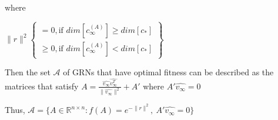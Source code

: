\documentclass[a4paper,12pt]{article}
\begin{document}
where 

$\lVert r \rVert^{2} \left\{\begin{array}{c} = 0, \text{if } dim{[c_{\infty}^{(A)}]} \geq dim{[c_{*}]} \\  \geq 0,  \text{if } dim{[c_{\infty}^{(A)}]} <  dim{[c_{*}]} \end{array} \right\}$

Then the set $\mathcal{A}$ of GRNs that have optimal fitness can be described as the matrices that satisfy $A = \frac{\hat{v_{\infty}} \hat{v_{\infty}^{T}}}{\lVert \hat{v_{\infty}} \rVert^{2}} + A'$ where $A' \hat{v_{\infty}} = 0$

Thus, $\mathcal{A} = \{A \in \mathbb{R}^{n \times n} : f(A) = e^{- \lVert r \rVert^{2}}, \ A' \hat{v_{\infty}} = 0 \}$
\end{document}
